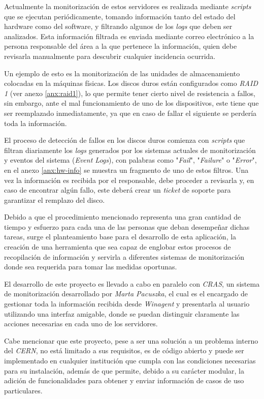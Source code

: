 Actualmente la monitorización de estos servidores es realizada mediante \textit{scripts} que se ejecutan periódicamente, tomando información tanto del estado del hardware como del software, y filtrando algunos de los \textit{logs} que deben ser analizados. Esta información filtrada es enviada mediante correo electrónico a la persona responsable del área a la que pertenece la información, quien debe revisarla manualmente para descubrir cualquier incidencia ocurrida.

Un ejemplo de esto es la monitorización de las unidades de almacenamiento colocadas en la máquinas físicas. Los discos duros están configurados como \textit{RAID 1} (ver anexo \ref{anx:raid1}), lo que permite tener cierto nivel de resistencia a fallos, sin embargo, ante el mal funcionamiento de uno de los dispositivos, este tiene que ser reemplazado inmediatamente, ya que en caso de fallar el siguiente se perdería toda la información.

El proceso de detección de fallos en los discos duros comienza con \textit{scripts} que filtran diariamente los \textit{logs} generados por los sistemas actuales de monitorización y eventos del sistema (\textit{Event Logs}), con palabras como "\textit{Fail}", "\textit{Failure}" o "\textit{Error}", en el anexo \ref{anx:hw-info} se muestra un fragmento de uno de estos filtros. Una vez la información es recibida por el responsable, debe proceder a revisarla y, en caso de encontrar algún fallo, este deberá crear un \textit{ticket} de soporte para garantizar el remplazo del disco.

Debido a que el procedimiento mencionado representa una gran cantidad de tiempo y esfuerzo para cada una de las personas que deban desempeñar dichas tareas, surge el planteamiento base para el desarrollo de esta aplicación, la creación de una herramienta que sea capaz de englobar estos procesos de recopilación de información y servirla a diferentes sistemas de monitorización donde sea requerida para tomar las medidas oportunas.

El desarrollo de este proyecto es llevado a cabo en paralelo con \textit{CRAS}, un sistema de monitorización desarrollado por \textit{Marta Pacuszka}, el cual es el encargado de gestionar toda la información recibida desde \textit{Winagent} y presentarla al usuario utilizando una interfaz amigable, donde se puedan distinguir claramente las acciones necesarias en cada uno de los servidores.

Cabe mencionar que este proyecto, pese a ser una solución a un problema interno del \textit{CERN}, no está limitado a sus requisitos, es de código abierto y puede ser implementado en cualquier institución que cumpla con las condiciones necesarias para su instalación, además de que permite, debido a su carácter modular, la adición de funcionalidades para obtener y enviar información de casos de uso particulares.

